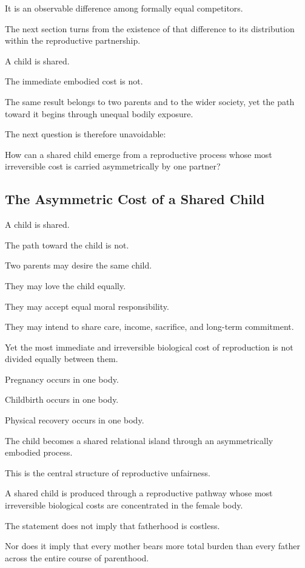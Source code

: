 It is an observable difference among formally equal competitors.

The next section turns from the existence of that difference to its distribution within the reproductive partnership.

A child is shared.

The immediate embodied cost is not.

The same result belongs to two parents and to the wider society, yet the path toward it begins through unequal bodily exposure.

The next question is therefore unavoidable:

How can a shared child emerge from a reproductive process whose most irreversible cost is carried asymmetrically by one partner?

\subsection*{\textbf{The Asymmetric Cost of a Shared Child}}


A child is shared.

The path toward the child is not.

Two parents may desire the same child.

They may love the child equally.

They may accept equal moral responsibility.

They may intend to share care, income, sacrifice, and long-term commitment.

Yet the most immediate and irreversible biological cost of reproduction is not divided equally between them.

Pregnancy occurs in one body.

Childbirth occurs in one body.

Physical recovery occurs in one body.

The child becomes a shared relational island through an asymmetrically embodied process.

This is the central structure of reproductive unfairness.

A shared child is produced through a reproductive pathway whose most irreversible biological costs are concentrated in the female body.

The statement does not imply that fatherhood is costless.

Nor does it imply that every mother bears more total burden than every father across the entire course of parenthood.

